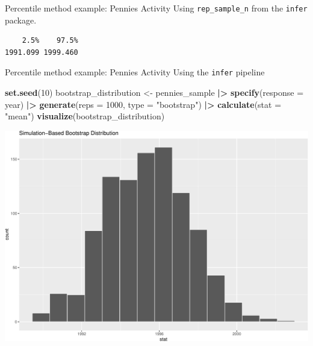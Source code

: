 \documentclass[
  ignorenonframetext,
]{beamer}
\newenvironment{Shaded}{\begin{snugshade}}{\end{snugshade}}
\newcommand{\AttributeTok}[1]{\textcolor[rgb]{0.13,0.29,0.53}{#1}}
\newcommand{\DecValTok}[1]{\textcolor[rgb]{0.00,0.00,0.81}{#1}}
\newcommand{\FloatTok}[1]{\textcolor[rgb]{0.00,0.00,0.81}{#1}}
\newcommand{\FunctionTok}[1]{\textcolor[rgb]{0.13,0.29,0.53}{\textbf{#1}}}
\newcommand{\NormalTok}[1]{#1}
\newcommand{\OtherTok}[1]{\textcolor[rgb]{0.56,0.35,0.01}{#1}}
\newcommand{\SpecialCharTok}[1]{\textcolor[rgb]{0.81,0.36,0.00}{\textbf{#1}}}
\newcommand{\StringTok}[1]{\textcolor[rgb]{0.31,0.60,0.02}{#1}}
\begin{document}
\begin{frame}[fragile]{Percentile method example: Pennies Activity}
\protect\hypertarget{percentile-method-example-pennies-activity-1}{}
Using \texttt{rep\_sample\_n} from the \texttt{infer} package.

\begin{Shaded}
\end{Shaded}

\begin{verbatim}
    2.5%    97.5% 
1991.099 1999.460 
\end{verbatim}
\end{frame}

\begin{frame}[fragile]{Percentile method example: Pennies Activity}
\protect\hypertarget{percentile-method-example-pennies-activity-2}{}
Using the \texttt{infer} pipeline

\tiny

\begin{Shaded}
\begin{Highlighting}[]
\FunctionTok{set.seed}\NormalTok{(}\DecValTok{10}\NormalTok{)}
\NormalTok{bootstrap\_distribution }\OtherTok{\textless{}{-}}\NormalTok{ pennies\_sample }\SpecialCharTok{|\textgreater{}} 
  \FunctionTok{specify}\NormalTok{(}\AttributeTok{response =}\NormalTok{ year) }\SpecialCharTok{|\textgreater{}} 
  \FunctionTok{generate}\NormalTok{(}\AttributeTok{reps =} \DecValTok{1000}\NormalTok{, }\AttributeTok{type =} \StringTok{"bootstrap"}\NormalTok{) }\SpecialCharTok{|\textgreater{}} 
  \FunctionTok{calculate}\NormalTok{(}\AttributeTok{stat =} \StringTok{"mean"}\NormalTok{)}
\FunctionTok{visualize}\NormalTok{(bootstrap\_distribution)}
\end{Highlighting}
\end{Shaded}

\begin{center}\includegraphics[width=0.7\linewidth,height=0.5\textheight]{Week10_Lect_files/figure-beamer/unnamed-chunk-16-1} \end{center}
\normalsize
\end{frame}
\end{document}
